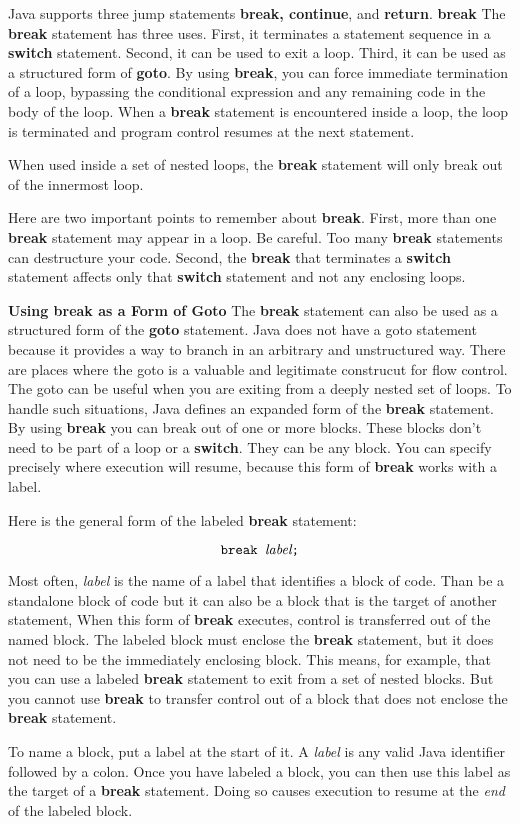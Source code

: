 Java supports three jump statements {\bf break, continue}, and {\bf return}.
\vskip 1cm
{\bf break}
\vskip 3mm
The {\bf break} statement has three uses. First, it terminates a statement sequence in a {\bf switch} statement. Second, it can be used to exit a loop. Third, it can be used as a structured form of {\bf goto}.
\vskip 1mm
By using {\bf break}, you can force immediate termination of a loop, bypassing the conditional expression and any remaining code in the body of the loop. When a {\bf break} statement is encountered inside a loop, the loop is terminated and program control resumes at the next statement.

\vskip 1mm
When used inside a set of nested loops, the {\bf break} statement will only break out of the innermost loop.

\vskip 1mm
Here are two important points to remember about {\bf break}. First, more than one {\bf break} statement may appear in a loop. Be careful. Too many {\bf break} statements can destructure your code. Second, the {\bf break} that terminates a {\bf switch} statement affects only that {\bf switch} statement and not any enclosing loops.

\vskip 1in
\filbreak
{\bf Using break as a Form of Goto}
\vskip 3mm
The {\bf break} statement can also be used as a structured form of the {\bf goto} statement. Java does not have a goto statement because it provides a way to branch in an arbitrary and unstructured way. There are places where the goto is a valuable and legitimate construcut for flow control. The goto can be useful when you are exiting from a deeply nested set of loops. To handle such situations, Java defines an expanded form of the {\bf break} statement. By using {\bf break} you can break out of one or more blocks. These blocks don't need to be part of a loop or a {\bf switch}. They can be any block. You can specify precisely where execution will resume, because this form of {\bf break} works with a label.

\vskip 1mm
Here is the general form of the labeled {\bf break} statement:

$$\hbox{\tt break {\it label};}$$

\vskip 1mm
Most often, {\it label} is the name of a label that identifies a block of code. Than be a standalone block of code but it can also be a block that is the target of another statement, When this form of {\bf break} executes, control is transferred out of the named block. The labeled block must enclose the {\bf break} statement, but it does not need to be the immediately enclosing block. This means, for example, that you can use a labeled {\bf break} statement to exit from a set of nested blocks. But you cannot use {\bf break} to transfer control out of a block that does not enclose the {\bf break} statement.

\vskip 1mm
To name a block, put a label at the start of it. A {\it label} is any valid Java identifier followed by a colon. Once you have labeled a block, you can then use this label as the target of a {\bf break} statement. Doing so causes execution to resume at the {\it end} of the labeled block.

\filbreak
\vfill\eject
\bye
